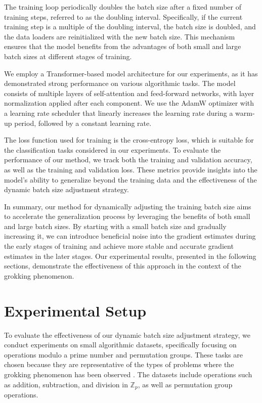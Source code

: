 \documentclass{article} %
\begin{document}
The training loop periodically doubles the batch size after a fixed number of training steps, referred to as the doubling interval. Specifically, if the current training step is a multiple of the doubling interval, the batch size is doubled, and the data loaders are reinitialized with the new batch size. This mechanism ensures that the model benefits from the advantages of both small and large batch sizes at different stages of training.

We employ a Transformer-based model architecture \citep{vaswani2017attention} for our experiments, as it has demonstrated strong performance on various algorithmic tasks. The model consists of multiple layers of self-attention and feed-forward networks, with layer normalization \citep{ba2016layer} applied after each component. We use the AdamW optimizer \citep{loshchilov2017adamw} with a learning rate scheduler that linearly increases the learning rate during a warm-up period, followed by a constant learning rate.

The loss function used for training is the cross-entropy loss, which is suitable for the classification tasks considered in our experiments. To evaluate the performance of our method, we track both the training and validation accuracy, as well as the training and validation loss. These metrics provide insights into the model's ability to generalize beyond the training data and the effectiveness of the dynamic batch size adjustment strategy.

In summary, our method for dynamically adjusting the training batch size aims to accelerate the generalization process by leveraging the benefits of both small and large batch sizes. By starting with a small batch size and gradually increasing it, we can introduce beneficial noise into the gradient estimates during the early stages of training and achieve more stable and accurate gradient estimates in the later stages. Our experimental results, presented in the following sections, demonstrate the effectiveness of this approach in the context of the grokking phenomenon.

\section{Experimental Setup}
\label{sec:experimental}

To evaluate the effectiveness of our dynamic batch size adjustment strategy, we conduct experiments on small algorithmic datasets, specifically focusing on operations modulo a prime number and permutation groups. These tasks are chosen because they are representative of the types of problems where the grokking phenomenon has been observed \citep{power2022grokking}. The datasets include operations such as addition, subtraction, and division in \(\mathbb{Z}_p\), as well as permutation group operations.
\end{document}
